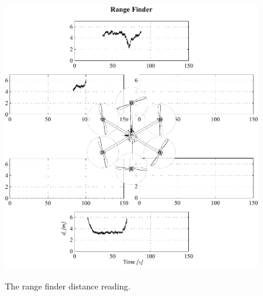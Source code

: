 \begin{figure}[f]
	\centering
	\includegraphics[]{ch4/img/RangeFinder.pdf}
\label{fig:rangefinder}
\caption{The range finder distance reading.}
\end{figure}

